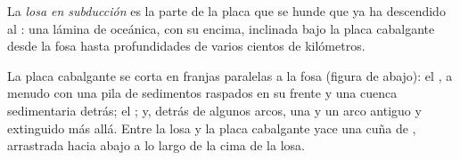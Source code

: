 \begin{definition}\label{def:b1:active-margins:slab}
La \emph{losa en subducción} es la parte de la placa que se hunde que ya ha descendido al : una lámina de
 oceánica, con su  encima, inclinada bajo la placa cabalgante desde la fosa hasta profundidades de varios cientos de kilómetros.
\end{definition}

La placa cabalgante se corta en franjas paralelas a la fosa (figura de abajo): el , a menudo con una pila de sedimentos raspados en su
frente y una cuenca sedimentaria detrás; el ; y, detrás de algunos arcos, una  y un arco antiguo y extinguido
más allá. Entre la losa y la placa cabalgante yace una cuña de , arrastrada hacia abajo a lo largo de la cima de la losa.

